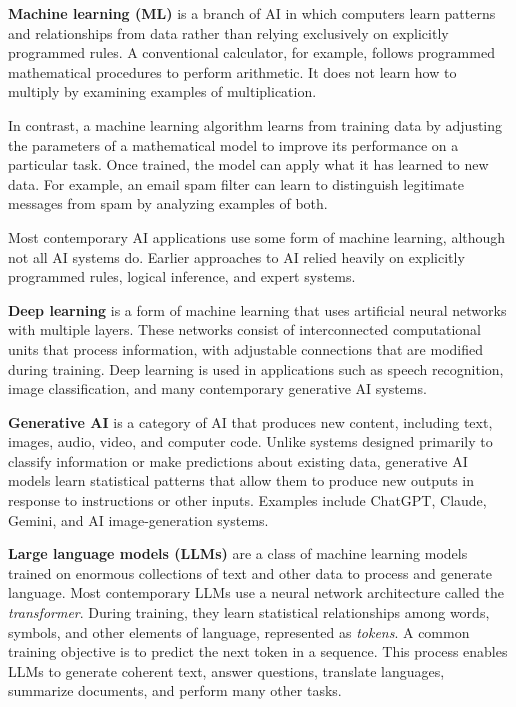 \documentclass[11pt]{article}
\begin{document}
\textbf{Machine learning (ML)}
is a branch of AI in which computers
learn patterns and relationships from data rather than relying
exclusively on explicitly programmed rules. A conventional
calculator, for example, follows programmed mathematical
procedures to perform arithmetic. It does not learn how to
multiply by examining examples of multiplication.

In contrast, a machine learning algorithm learns from training data by adjusting the parameters of a mathematical model to improve its performance on a particular task. Once trained, the model can apply what it has learned to new data. For example, an email spam filter can learn to distinguish legitimate messages from spam by analyzing examples of both.

Most contemporary AI applications use some form of machine learning,
although not all AI systems do. Earlier approaches to AI relied
heavily on explicitly programmed rules, logical inference, and
expert systems.

\textbf{Deep learning} is a form of machine learning that uses artificial neural networks with multiple layers. These networks consist of interconnected computational units that process information, with adjustable connections that are modified during training. Deep learning is used in applications such as speech recognition, image classification, and many contemporary generative AI systems.

\textbf{Generative AI} is a category of AI that produces new content,
including text, images, audio, video, and computer code. Unlike
systems designed primarily to classify information or make predictions
about existing data, generative AI models learn statistical patterns
that allow them to produce new outputs in response to instructions
or other inputs. Examples include ChatGPT, Claude, Gemini, and AI
image-generation systems.

\textbf{Large language models (LLMs)} are a class of machine learning
models trained on enormous collections of text and other data to
process and generate language. Most contemporary LLMs use a neural
network architecture called the \emph{transformer}. During training,
they learn statistical relationships among words, symbols, and
other elements of language, represented as \emph{tokens}. A common
training objective is to predict the next token in a sequence.
This process enables LLMs to generate coherent text, answer
questions, translate languages, summarize documents, and perform
many other tasks.
\end{document}
